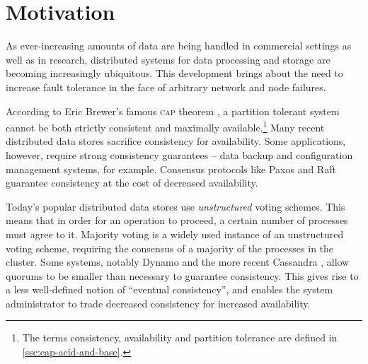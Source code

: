 \documentclass[12pt,chapterprefix=true,toc=bibliography,numbers=noendperiod,
               footnotes=multiple,twoside]{scrreprt}
\begin{document}

\section{Motivation}
\label{sc:motivation}

As ever-increasing amounts of data are being handled in commercial settings as well as in research, distributed systems for data processing and storage are becoming increasingly ubiquitous. This development brings about the need to increase fault tolerance in the face of arbitrary network and node failures.

According to Eric Brewer's famous \textsc{cap} theorem \autocite{cap}, a partition tolerant system cannot be both strictly consistent and maximally available.\footnote{The terms consistency, availability and partition tolerance are defined in \cref{ssc:cap-acid-and-base}.} Many recent distributed data stores sacrifice consistency for availability. Some applications, however, require strong consistency guarantees -- data backup and configuration management systems, for example. Consensus protocols like Paxos \autocite{paxos} and Raft \autocite{raft} guarantee consistency at the cost of decreased availability.

Today's popular distributed data stores use \emph{unstructured} voting schemes. This means that in order for an operation to proceed, a certain number of processes must agree to it. Majority voting is a widely used instance of an unstructured voting scheme, requiring the consensus of a majority of the processes in the cluster. Some systems, notably Dynamo \autocite{dynamo} and the more recent Cassandra \autocite{cassandra}, allow quorums to be smaller than necessary to guarantee consistency. This gives rise to a less well-defined notion of \enquote{eventual consistency}, and enables the system administrator to trade decreased consistency for increased availability.
\end{document}
